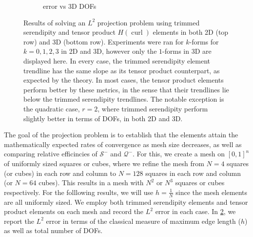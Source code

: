 \documentclass[format=acmsmall,screen,timestamp=false,a4paper]{acmart}
\DeclareMathOperator{\curl}{curl}
\newcommand{\hcurl}{\ensuremath{{H}(\curl)}\xspace}
\begin{document}
\begin{figure}[htbp]
\begin{subfigure}[h]{0.48\textwidth}
    \caption{error vs 3D DOFs\label{fig:3dProjectionDofs}}
  \end{subfigure}
  \caption{Results of solving an $L^2$ projection problem using trimmed serendipity and tensor product \hcurl elements in both 2D (top row) and 3D (bottom row).  Experiments were ran for $k$-forms for $k=0,1,2,3$ in 2D and 3D, however only the $1$-forms in 3D are displayed here.  In every case, the trimmed serendipity element trendline has the same slope as its tensor product counterpart, as expected by the theory.  In most cases, the tensor product elements perform better by these metrics, in the sense that their trendlines lie below the trimmed serendipity trendlines.  The notable exception is the quadratic case, $r=2$, where trimmed serendipity perform slightly better in terms of DOFs, in both 2D and 3D.\label{Projections}} 
\end{figure}

The goal of the projection problem is to establish that the elements attain the mathematically expected rates of convergence as mesh size decreases, as well as comparing relative efficincies of $\mathcal{S}^-$ and $\mathcal{Q}^-$.  For this, we create a mesh on $[0,1]^n$ of uniformly sized squares or cubes, where we refine the mesh from $N=4$ squares (or cubes) in each row and column to $N=128$ squares in each row and column (or $N=64$ cubes).  This results in a mesh with $N^2$ or $N^3$ squares or cubes respectively.  For the folllowing results, we will use $h = \frac{1}{N}$ since the mesh elements are all uniformly sized. 
We employ both trimmed serendipity elements and tensor product elements on each mesh and record the $L^2$ error in each case.  In \cref{Projections}, we report the $L^2$ error in terms of the classical measure of maximum edge length ($h$) as well as total number of  DOFs.
\end{document}
